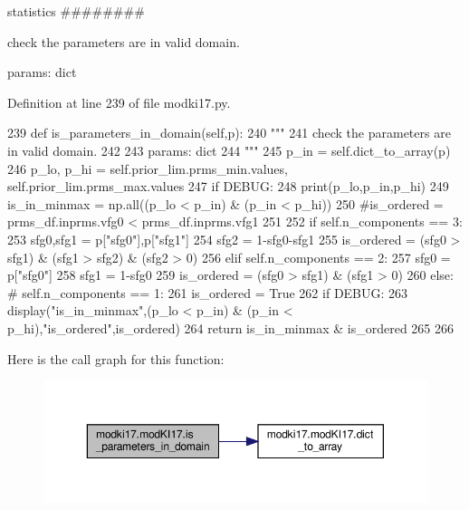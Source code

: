 statistics \#\#\#\#\#\#\#\# 

\begin{DoxyVerb}check the parameters are in valid domain.

params: dict
\end{DoxyVerb}
 

Definition at line 239 of file modki17.\+py.


\begin{DoxyCode}
239     \textcolor{keyword}{def }is\_parameters\_in\_domain(self,p):
240         \textcolor{stringliteral}{"""}
241 \textcolor{stringliteral}{        check the parameters are in valid domain.}
242 \textcolor{stringliteral}{        }
243 \textcolor{stringliteral}{        params: dict}
244 \textcolor{stringliteral}{        """}
245         p\_in = self.dict\_to\_array(p)
246         p\_lo, p\_hi = self.prior\_lim.prms\_min.values, self.prior\_lim.prms\_max.values
247         \textcolor{keywordflow}{if} DEBUG:
248             print(p\_lo,p\_in,p\_hi)
249         is\_in\_minmax = np.all((p\_lo < p\_in) & (p\_in < p\_hi))
250         \textcolor{comment}{#is\_ordered = prms\_df.inprms.vfg0 < prms\_df.inprms.vfg1}
251         
252         \textcolor{keywordflow}{if} self.n\_components == 3:
253             sfg0,sfg1 = p[\textcolor{stringliteral}{"sfg0"}],p[\textcolor{stringliteral}{"sfg1"}]
254             sfg2 = 1-sfg0-sfg1
255             is\_ordered = (sfg0 > sfg1) & (sfg1 > sfg2) & (sfg2 > 0)
256         \textcolor{keywordflow}{elif} self.n\_components == 2:
257             sfg0 = p[\textcolor{stringliteral}{"sfg0"}]
258             sfg1 = 1-sfg0
259             is\_ordered = (sfg0 > sfg1) & (sfg1 > 0)
260         \textcolor{keywordflow}{else}: \textcolor{comment}{# self.n\_components == 1:}
261             is\_ordered = \textcolor{keyword}{True}
262         \textcolor{keywordflow}{if} DEBUG:
263             display(\textcolor{stringliteral}{"is\_in\_minmax"},(p\_lo < p\_in) & (p\_in < p\_hi),\textcolor{stringliteral}{"is\_ordered"},is\_ordered)
264         \textcolor{keywordflow}{return} is\_in\_minmax & is\_ordered
265 
266     
\end{DoxyCode}
Here is the call graph for this function\+:\nopagebreak
\begin{figure}[H]
\begin{center}
\leavevmode
\includegraphics[width=350pt]{df/da3/classmodki17_1_1modKI17_a649064bb198ade8a8c6c59faeab6c9c4_cgraph}
\end{center}
\end{figure}
